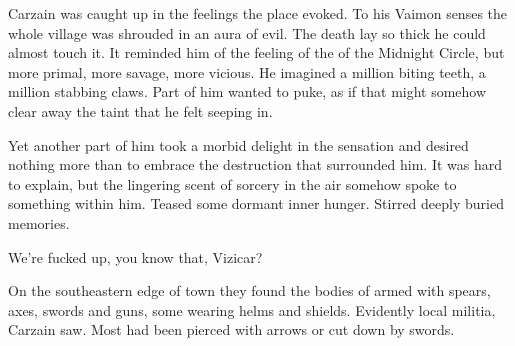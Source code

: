 


Carzain was caught up in the feelings the place evoked. 
To his Vaimon senses the whole village was shrouded in an aura of evil. 
The death lay so thick he could almost touch it. 
It reminded him of the feeling of the \qliphoth{} of the Midnight Circle, but more primal, more savage, more vicious. 
He imagined a million biting teeth, a million stabbing claws. 
Part of him wanted to puke, as if that might somehow clear away the taint that he felt seeping in. 

Yet another part of him took a morbid delight in the sensation and desired nothing more than to embrace the destruction that surrounded him. 
It was hard to explain, but the lingering scent of sorcery in the air somehow spoke to something within him. 
Teased some dormant inner hunger. 
Stirred deeply buried memories. 


We're fucked up, you know that, Vizicar?








\begin{comment}
\section{A thousand mouths}
\end{comment}
\new
On the southeastern edge of town they found the bodies of \scathae{} armed with spears, axes, swords and guns, some wearing helms and shields. 
Evidently local militia, Carzain saw. 
Most had been pierced with arrows or cut down by swords. 

